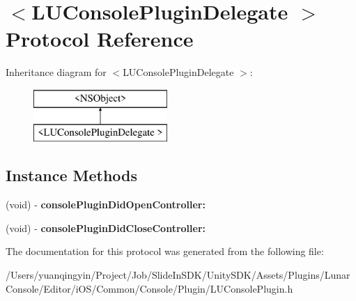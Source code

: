 \hypertarget{protocol_l_u_console_plugin_delegate_01-p}{}\section{$<$L\+U\+Console\+Plugin\+Delegate $>$ Protocol Reference}
\label{protocol_l_u_console_plugin_delegate_01-p}
Inheritance diagram for $<$L\+U\+Console\+Plugin\+Delegate $>$\+:\begin{figure}[H]
\begin{center}
\leavevmode
\includegraphics[height=2.000000cm]{protocol_l_u_console_plugin_delegate_01-p}
\end{center}
\end{figure}
\subsection*{Instance Methods}
\begin{DoxyCompactItemize}
\item 
\mbox{\label{protocol_l_u_console_plugin_delegate_01-p_a3673ceb72fcf49f87268191842bb2df9}} 
(void) -\/ {\bfseries console\+Plugin\+Did\+Open\+Controller\+:}
\item 
\mbox{\label{protocol_l_u_console_plugin_delegate_01-p_a2d9b2b56ec45ebfec5594405a9158f42}} 
(void) -\/ {\bfseries console\+Plugin\+Did\+Close\+Controller\+:}
\end{DoxyCompactItemize}


The documentation for this protocol was generated from the following file\+:\begin{DoxyCompactItemize}
\item 
/\+Users/yuanqingyin/\+Project/\+Job/\+Slide\+In\+S\+D\+K/\+Unity\+S\+D\+K/\+Assets/\+Plugins/\+Lunar\+Console/\+Editor/i\+O\+S/\+Common/\+Console/\+Plugin/L\+U\+Console\+Plugin.\+h\end{DoxyCompactItemize}

